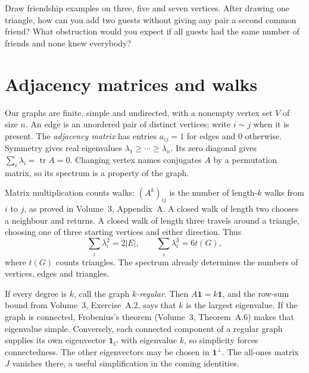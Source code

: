 
\begin{think}
Draw friendship examples on three, five and seven vertices. After drawing one triangle, how can you add two guests without giving any pair a second common friend? What obstruction would you expect if all guests had the same number of friends and none knew everybody?
\end{think}

\section{Adjacency matrices and walks}

Our graphs are finite, simple and undirected, with a nonempty vertex set $V$ of size $n$. An edge is an unordered pair of distinct vertices; write $i\sim j$ when it is present. The \emph{adjacency matrix} has entries $a_{ij}=1$ for edges and $0$ otherwise. Symmetry gives real eigenvalues $\lambda_1\ge\cdots\ge\lambda_n$. Its zero diagonal gives $\sum_i\lambda_i=\operatorname{tr}A=0$. Changing vertex names conjugates $A$ by a permutation matrix, so its spectrum is a property of the graph.

Matrix multiplication counts walks: $(A^k)_{ij}$ is the number of length-$k$ walks from $i$ to $j$, as proved in Volume~3, Appendix~A. A closed walk of length two chooses a neighbour and returns. A closed walk of length three travels around a triangle, choosing one of three starting vertices and either direction. Thus
\[
\sum_i\lambda_i^2=2|E|,\qquad \sum_i\lambda_i^3=6t(G),
\]
where $t(G)$ counts triangles. The spectrum already determines the numbers of vertices, edges and triangles.

If every degree is $k$, call the graph \emph{$k$-regular}. Then $A\mathbf1=k\mathbf1$, and the row-sum bound from Volume~3, Exercise~A.2, says that $k$ is the largest eigenvalue. If the graph is connected, Frobenius's theorem (Volume~3, Theorem~A.6) makes that eigenvalue simple. Conversely, each connected component of a regular graph supplies its own eigenvector $\mathbf1_C$ with eigenvalue $k$, so simplicity forces connectedness. The other eigenvectors may be chosen in $\mathbf1^\perp$. The all-ones matrix $J$ vanishes there, a useful simplification in the coming identities.

